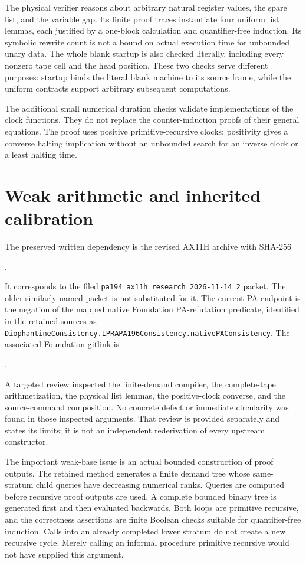 \documentclass[11pt,a4paper]{article}
\theoremstyle{definition}\newtheorem{definition}[theorem]{Definition}
\theoremstyle{remark}\newtheorem{remark}[theorem]{Remark}
\newcommand{\file}[1]{\nolinkurl{#1}}
\begin{document}
The physical verifier reasons about arbitrary natural register values,
the spare list, and the variable gap. Its finite proof traces instantiate
four uniform list lemmas, each justified by a one-block calculation and
quantifier-free induction. Its symbolic rewrite count is not a bound on
actual execution time for unbounded unary data. The whole blank startup
is also checked literally, including every nonzero tape cell and the
head position. These two checks serve different purposes: startup binds
the literal blank machine to its source frame, while the uniform
contracts support arbitrary subsequent computations.

The additional small numerical duration checks validate implementations
of the clock functions. They do not replace the counter-induction proofs
of their general equations. The proof uses positive primitive-recursive
clocks; positivity gives a converse halting implication without an
unbounded search for an inverse clock or a least halting time.

\section{Weak arithmetic and inherited calibration}

The preserved written dependency is the revised AX11H archive with SHA-256
\begin{center}\footnotesize
{}.
\end{center}
It corresponds to the filed \file{pa194_ax11h_research_2026-11-14_2}
packet. The older similarly named packet is not substituted for it.
The current PA endpoint is the negation of the mapped native Foundation
PA-refutation predicate, identified in the retained sources as
\file{DiophantineConsistency.IPRAPA196Consistency.nativePAConsistency}.
The associated Foundation gitlink is
\begin{center}\small{}.\end{center}

A targeted review inspected the finite-demand compiler, the complete-tape
arithmetization, the physical list lemmas, the positive-clock converse,
and the source-command composition. No concrete defect or immediate
circularity was found in those inspected arguments. That review is
provided separately and states its limits; it is not an independent
rederivation of every upstream constructor.

The important weak-base issue is an actual bounded construction of proof
outputs. The retained method generates a finite demand tree whose
same-stratum child queries have decreasing numerical ranks. Queries are
computed before recursive proof outputs are used. A complete bounded
binary tree is generated first and then evaluated backwards. Both loops
are primitive recursive, and the correctness assertions are finite
Boolean checks suitable for quantifier-free induction. Calls into an
already completed lower stratum do not create a new recursive cycle.
Merely calling an informal procedure primitive recursive would not have
supplied this argument.
\end{document}
